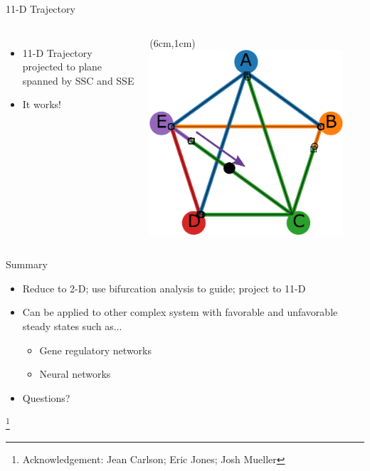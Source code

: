 \documentclass[15pt]{beamer}
\newcommand\blfootnote[1]{%
  \begingroup
  \renewcommand\thefootnote{}\footnote{#1}%
  \addtocounter{footnote}{-1}%
  \endgroup
  }
\begin{document}
\begin{frame}{11-D Trajectory}
\begin{columns}
\begin{itemize}
	\item 11-D Trajectory projected to plane spanned by SSC and SSE 
	\item It works!
\end{itemize}

	\begin{textblock*}{7cm}(6cm,1cm) %
	 \includegraphics[width=0.9\textwidth]{attractor_network_v3_w_arrow}
	\end{textblock*}
\end{columns}
\end{frame}

\begin{frame}{Summary}
\begin{thebibliography}{99} 
\end{thebibliography}
\begin{itemize}
	\item Reduce to 2-D; use bifurcation analysis to guide; project to 11-D
	\item Can be applied to other complex system with favorable and unfavorable steady states such as...
	\begin{itemize}
	\item Gene regulatory networks
	\item Neural networks
	\end{itemize}

	\item Questions?
\end{itemize}
\blfootnote{Acknowledgement: Jean Carlson; Eric Jones;
Josh Mueller}
\end{frame}
\end{document}
